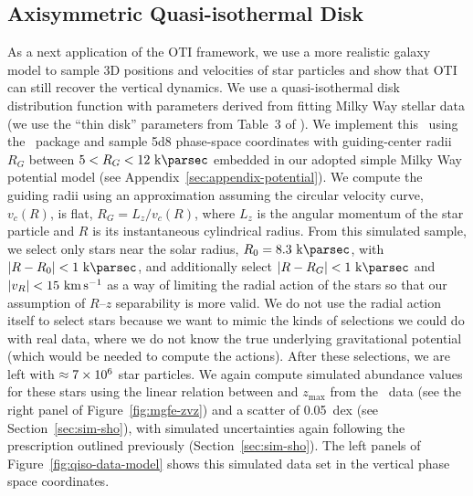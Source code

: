 \subsection{Axisymmetric Quasi-isothermal Disk}
\label{sec:sim-qiso}

As a next application of the OTI framework, we use a more realistic galaxy model to
sample 3D positions and velocities of star particles and show that OTI can still recover
the vertical dynamics.
We use a quasi-isothermal disk distribution function \citep[\df;][]{Binney:2012} with
parameters derived from fitting Milky Way stellar data (we use the ``thin disk''
parameters from Table~3 of \citealt{Sanders:2015}).
We implement this \df\ using the \agama\ package \citep{Vasiliev:2019} and sample
\num{5d8} phase-space coordinates with guiding-center radii $R_G$ between $5 < R_G <
12~\kpc$ embedded in our adopted simple Milky Way potential model (see
Appendix~\ref{sec:appendix-potential}).
We compute the guiding radii using an approximation assuming the circular velocity
curve, $v_c(R)$, is flat, $R_G = L_z / v_c(R)$, where $L_z$ is the angular momentum of
the star particle and $R$ is its instantaneous cylindrical radius.
From this simulated sample, we select only stars near the solar radius, $R_0=8.3~\kpc$,
with $|R-R_0| < 1~\kpc$, and additionally select $|R-R_G| < 1~\kpc$ and $|v_R| <
15~\kms$ as a way of limiting the radial action of the stars so that our assumption of
$R$--$z$ separability is more valid.
We do not use the radial action itself to select stars because we want to mimic the
kinds of selections we could do with real data, where we do not know the true underlying
gravitational potential (which would be needed to compute the actions).
After these selections, we are left with $\approx \num{7d6}$ star particles.
We again compute simulated  abundance values for these stars using the
linear relation between  and $z_{\textrm{max}}$ from the \apogee\ data (see
the right panel of Figure~\ref{fig:mgfe-zvz}) and a scatter of 0.05~dex (see
Section~\ref{sec:sim-sho}), with simulated uncertainties again following the
prescription outlined previously (Section~\ref{sec:sim-sho}).
The left panels of Figure~\ref{fig:qiso-data-model} shows this simulated data set in the
vertical phase space coordinates.

